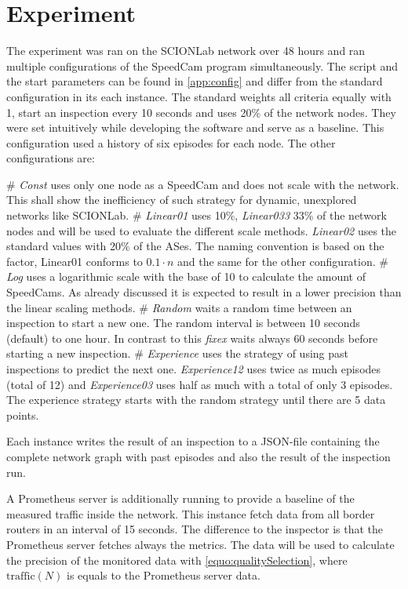 \documentclass[thesis.tex]{subfiles}
\begin{document}
\section{Experiment}

The experiment was ran on the SCIONLab network over 48 hours and ran multiple configurations of the SpeedCam program simultaneously. The script and the start parameters can be found in \autoref{app:config} and differ from the standard configuration in its each instance. The standard weights all criteria equally with 1, start an inspection every 10 seconds and uses 20\% of the network nodes. They were set intuitively while developing the software and serve as a baseline. This configuration used a history of six episodes for each node. The other configurations are:

\begin{easylist}
	\MyListProperties
	# \textit{Const} uses only one node as a SpeedCam and does not scale with the network. This shall show the inefficiency of such strategy for dynamic, unexplored networks like SCIONLab.
	# \textit{Linear01} uses 10\%, \textit{Linear033} 33\% of the network nodes and will be used to evaluate the different scale methods. \textit{Linear02} uses the standard values with 20\% of the ASes. The naming convention is based on the factor, Linear01 conforms to $0.1 \cdot n$ and the same for the other configuration.
	# \textit{Log} uses a logarithmic scale with the base of 10 to calculate the amount of SpeedCams. As already discussed it is expected to result in a lower precision than the linear scaling methods.
	# \textit{Random} waits a random time between an inspection to start a new one. The random interval is between 10 seconds (default) to one hour. In contrast to this \textit{fixex} waits always 60 seconds before starting a new inspection.
	# \textit{Experience} uses the strategy of using past inspections to predict the next one. \textit{Experience12} uses twice as much episodes (total of 12) and \textit{Experience03} uses half as much with a total of only 3 episodes. The experience strategy starts with the random strategy until there are 5 data points.		
\end{easylist}

Each instance writes the result of an inspection to a JSON-file containing the complete network graph with past episodes and also the result of the inspection run. 

A Prometheus server is additionally running to provide a baseline of the measured traffic inside the network. This instance fetch data from all border routers in an interval of 15 seconds. The difference to the inspector is that the Prometheus server fetches always the metrics. The data will be used to calculate the precision of the monitored data with \autoref{equo:qualitySelection}, where $\text{traffic}(N)$ is equals to the Prometheus server data. 
\end{document}

